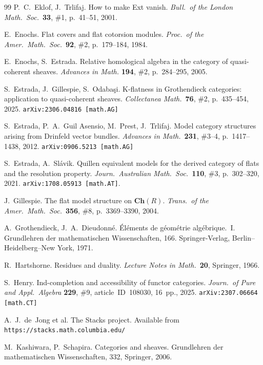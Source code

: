 \documentclass[12pt,a4paper]{amsart}
\newcommand{\+}{\protect\nobreakdash-}
\renewcommand{\:}{\colon}
\theoremstyle{plain}
\theoremstyle{definition}
\begin{document}
\begin{thebibliography}{99}
 P.~C.~Eklof, J.~Trlifaj.
   How to make Ext vanish.
\textit{Bull.\ of the London Math.\ Soc.}\ \textbf{33}, \#1,
p.~41--51, 2001.

 E.~Enochs.
   Flat covers and flat cotorsion modules.
\textit{Proc.\ of the Amer.\ Math.\ Soc.}\ \textbf{92}, \#2,
p.~179--184, 1984.

 E.~Enochs, S.~Estrada.
   Relative homological algebra in the category of quasi-coherent
sheaves.
\textit{Advances in Math.} \textbf{194}, \#2, p.~284--295, 2005.

 S.~Estrada, J.~Gillespie, S.~Odaba\c si.
   K\+flatness in Grothendieck categories: application to
quasi-coherent sheaves.
\textit{Collectanea Math.}\ \textbf{76}, \#2, p.~435--454, 2025.
\texttt{arXiv:2306.04816 [math.AG]}

 S.~Estrada, P.~A.~Guil Asensio, M.~Prest, J.~Trlifaj.
   Model category structures arising from Drinfeld vector bundles.
\textit{Advances in Math.}\ \textbf{231}, \#3--4, p.~1417--1438, 2012.
\texttt{arXiv:0906.5213 [math.AG]}

 S.~Estrada, A.~Sl\'avik.
   Quillen equivalent models for the derived category of flats
and the resolution property.
\textit{Journ.\ Australian Math.\ Soc.}\ \textbf{110}, \#3,
p.~302--320, 2021.  \texttt{arXiv:1708.05913 [math.AT]}.

 J.~Gillespie.
   The flat model structure on $\mathbf{Ch}(R)$.
\textit{Trans.\ of the Amer.\ Math.\ Soc.}\ \textbf{356}, \#8,
p.~3369--3390, 2004.

 A.~Grothendieck, J.~A.~Dieudonn\'e.
   \'El\'ements de g\'eom\'etrie alg\'ebrique.~I.
Grundlehren der mathematischen Wissenschaften, 166.
Springer-Verlag, Berlin--Heidelberg--New York, 1971.

 R.~Hartshorne.
   Residues and duality.
\textit{Lecture Notes in Math.}\ \textbf{20}, Springer, 1966.

 S.~Henry.
   Ind-completion and accessibility of functor categories.
\textit{Journ.\ of Pure and Appl.\ Algebra} \textbf{229}, \#9,
article~ID~108030, 16~pp., 2025.  \texttt{arXiv:2307.06664 [math.CT]}

 A.~J.~de~Jong et al.
   The Stacks project.
Available from \texttt{https://stacks.math.columbia.edu/}

 M.~Kashiwara, P.~Schapira.
   Categories and sheaves.
Grundlehren der mathematischen Wissenschaften, 332,
Springer, 2006.


\end{thebibliography}
\end{document}
